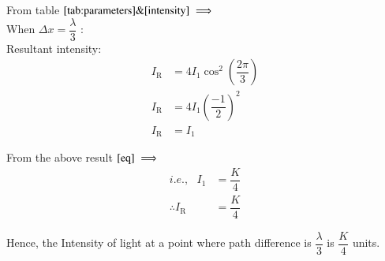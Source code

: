 \documentclass[journal,12pt,twocolumn]{IEEEtran}
\theoremstyle{remark}
\begin{document}
From table $\eqref{tab:parameters} \& \eqref{intensity} \implies$ \\
\hspace*{1.8cm}When $\Delta x = \dfrac{\lambda}{3}$ : \\
Resultant intensity:
\begin{align}
I_{\text{R}} &= 4I_1\cos^2\left(\dfrac{2\pi}{3}\right) \nonumber  \\
I_{\text{R}} &= 4I_1\left(\dfrac{-1}{2}\right)^2\nonumber \\
I_{\text{R}} &= I_1
\end{align}

From the above result $ \eqref{eq} \implies$
\hspace*{0.5cm}
\begin{align}
i.e.,  \,\,\,\, I_1 &= \dfrac{K}{4} \nonumber \\
\therefore I_{\text{R}} &= \dfrac{K}{4} 
\end{align}

Hence, the Intensity of light at a point where path difference is $\dfrac{\lambda}{3}$ is $\dfrac{K}{4}$ units.


\end{document}
